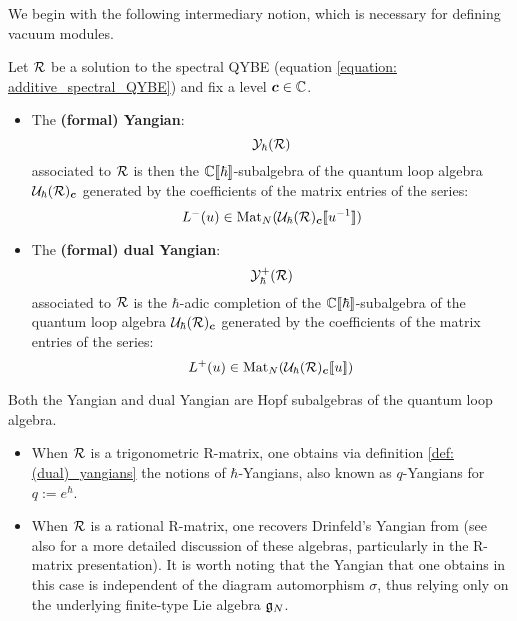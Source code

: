        We begin with the following intermediary notion, which is necessary for defining vacuum modules.
        \begin{definition} \label{def: (dual)_yangians}
            Let $\mathcal{R}$ be a solution to the spectral QYBE (equation \eqref{equation: additive_spectral_QYBE}) and fix a level $\boldsymbol{c} \in \mathbb{C}$.
            \begin{itemize}
                \item The \textbf{(formal) Yangian}:
                    $$\mathcal{Y}_{\hbar}(\mathcal{R})$$
                associated to $\mathcal{R}$ is then the $\mathbb{C}[\![\hbar]\!]$-subalgebra of the quantum loop algebra $\mathcal{U}_{\hbar}(\mathcal{R})_{\boldsymbol{c}}$ generated by the coefficients of the matrix entries of the series:
                    $$L^-(u) \in \operatorname{Mat}_N( \mathcal{U}_{\hbar}(\mathcal{R})_{\boldsymbol{c}}[\![u^{-1}]\!] )$$
                \item The \textbf{(formal) dual Yangian}:
                    $$\mathcal{Y}^+_{\hbar}(\mathcal{R})$$
                associated to $\mathcal{R}$ is the $\hbar$-adic completion of the $\mathbb{C}[\![\hbar]\!]$-subalgebra of the quantum loop algebra $\mathcal{U}_{\hbar}(\mathcal{R})_{\boldsymbol{c}}$ generated by the coefficients of the matrix entries of the series:
                    $$L^+(u) \in \operatorname{Mat}_N( \mathcal{U}_{\hbar}(\mathcal{R})_{\boldsymbol{c}}[\![u]\!] )$$
            \end{itemize}
        \end{definition}
        \begin{remark}
            Both the Yangian and dual Yangian are Hopf subalgebras of the quantum loop algebra.
        \end{remark}
        \begin{example} \label{example: trigonometric_and_rational_yangians}
            \begin{itemize}
                \item When $\mathcal{R}$ is a trigonometric R-matrix, one obtains via definition \ref{def: (dual)_yangians} the notions of $\hbar$-Yangians, also known as $q$-Yangians for $q := e^{\hbar}$.  
                \item When $\mathcal{R}$ is a rational R-matrix, one recovers Drinfeld's Yangian from \cite{drinfeld_original_yangian_paper} (see also \cite[Chapter 1]{molev_yangians_and_classical_lie_algebras} for a more detailed discussion of these algebras, particularly in the R-matrix presentation). It is worth noting that the Yangian that one obtains in this case is independent of the diagram automorphism $\sigma$, thus relying only on the underlying finite-type Lie algebra $\mathfrak{g}_N$.
            \end{itemize}
        \end{example}
        \begin{definition} \label{def: abstract_vacuum_modules}
        \end{definition}
    
